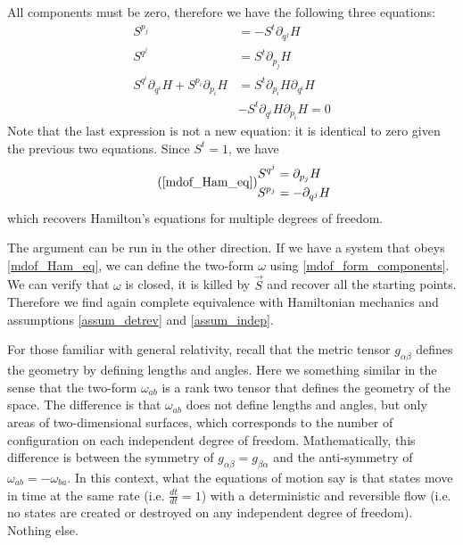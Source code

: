 \documentclass[10pt,twocolumn, nofootinbib]{revtex4-2}
\begin{document}
All components must be zero, therefore we have the following three equations:
\begin{equation}
\begin{aligned}
	S^{p_j} &= - S^{t} \partial_{q^j} H \\
	S^{q^j} &= S^{t}\partial_{p_j} H \\
	S^{q^i} \partial_{q^i} H + S^{p_i} \partial_{p_i} H &= S^{t}\partial_{p_i} H \partial_{q^i} H \\
	& - S^{t} \partial_{q^i} H \partial_{p_i} H = 0
\end{aligned}
\end{equation}
Note that the last expression is not a new equation: it is identical to zero given the previous two equations. Since $S^t = 1$, we have
\begin{equation}
	\tag*{(\ref{mdof_Ham_eq})}
\begin{aligned}
	S^{q^j} &= \partial_{p_j} H \\
	S^{p_j} &= - \partial_{q^j} H 
\end{aligned}
\end{equation}
which recovers Hamilton's equations for multiple degrees of freedom.

The argument can be run in the other direction. If we have a system that obeys \ref{mdof_Ham_eq}, we can define the two-form $\omega$ using \ref{mdof_form_components}. We can verify that $\omega$ is closed, it is killed by $\vec{S}$ and recover all the starting points. Therefore we find again complete equivalence with Hamiltonian mechanics and assumptions \ref{assum_detrev} and \ref{assum_indep}.

For those familiar with general relativity, recall that the metric tensor $g_{\alpha\beta}$ defines the geometry by defining lengths and angles. Here we something similar in the sense that the two-form $\omega_{ab}$ is a rank two tensor that defines the geometry of the space. The difference is that $\omega_{ab}$ does not define lengths and angles, but only areas of two-dimensional surfaces, which corresponds to the number of configuration on each independent degree of freedom. Mathematically, this difference is between the symmetry of $g_{\alpha\beta} = g_{\beta\alpha}$ and the anti-symmetry of $\omega_{ab} = -\omega_{ba}$. In this context, what the equations of motion say is that states move in time at the same rate (i.e. $\frac{dt}{dt} = 1$) with a deterministic and reversible flow (i.e. no states are created or destroyed on any independent degree of freedom). Nothing else.
\end{document}
